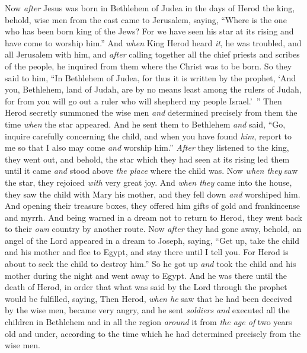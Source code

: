 \begin{biblechapter} %
 Now \textit{after} Jesus was born in Bethlehem of Judea in the days of Herod the king, behold, wise men from the east came to Jerusalem,
\verse saying, “Where is the one who has been born king of the Jews? For we have seen his star at its rising and have come to worship him.”
\verse And \textit{when} King Herod heard \textit{it}, he was troubled, and all Jerusalem with him,
\verse and \textit{after} calling together all the chief priests and scribes of the people, he inquired from them where the Christ was to be born.
\verse So they said to him, “In Bethlehem of Judea, for thus it is written by the prophet,
\verse ‘And you, Bethlehem, land of Judah, 
are by no means least among the rulers of Judah, 
for from you will go out a ruler 
who will shepherd my people Israel.’ ”
\verse Then Herod secretly summoned the wise men \textit{and} determined precisely from them the time \textit{when} the star appeared.
\verse And he sent them to Bethlehem \textit{and} said, “Go, inquire carefully concerning the child, and when you have found \textit{him}, report to me so that I also may come \textit{and} worship him.”
\verse \textit{After} they listened to the king, they went out, and behold, the star which they had seen at its rising led them until it came \textit{and} stood above \textit{the place} where the child was.
\verse Now \textit{when they} saw the star, they rejoiced \textit{with} very great joy.
\verse And \textit{when they} came into the house, they saw the child with Mary his mother, and they fell down \textit{and} worshiped him. And opening their treasure boxes, they offered him gifts of gold and frankincense and myrrh.
\verse And being warned in a dream not to return to Herod, they went back to their \textit{own} country by another route.
 Now \textit{after} they had gone away, behold, an angel of the Lord appeared in a dream to Joseph, saying, “Get up, take the child and his mother and flee to Egypt, and stay there until I tell you. For Herod is about to seek the child to destroy him.”
\verse So he got up \textit{and} took the child and his mother during the night and went away to Egypt.
\verse And he was there until the death of Herod, in order that what was said by the Lord through the prophet would be fulfilled, saying,
 Then Herod, \textit{when he} saw that he had been deceived by the wise men, became very angry, and he sent \textit{soldiers} \textit{and} executed all the children in Bethlehem and in all the region \textit{around} it from \textit{the age of} two years old and under, according to the time which he had determined precisely from the wise men.

\end{biblechapter}
